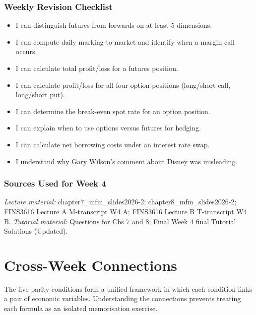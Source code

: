 \documentclass[11pt,a4paper]{article}
\newcommand{\cb}{\(\square\)\enspace}
\begin{document}
\subsubsection*{Weekly Revision Checklist}
\begin{itemize}[leftmargin=2em]
  \item[\cb] I can distinguish futures from forwards on at least 5 dimensions.
  \item[\cb] I can compute daily marking-to-market and identify when a margin call occurs.
  \item[\cb] I can calculate total profit/loss for a futures position.
  \item[\cb] I can calculate profit/loss for all four option positions (long/short call, long/short put).
  \item[\cb] I can determine the break-even spot rate for an option position.
  \item[\cb] I can explain when to use options versus futures for hedging.
  \item[\cb] I can calculate net borrowing costs under an interest rate swap.
  \item[\cb] I understand why Gary Wilson's comment about Disney was misleading.
\end{itemize}

\subsubsection*{Sources Used for Week 4}
{\sloppy\noindent\textit{Lecture material:} chapter7\_mfm\_slides2026-2; chapter8\_mfm\_slides2026-2; FINS3616 Lecture A M-transcript W4 A; FINS3616 Lecture B T-transcript W4 B\@. \textit{Tutorial material:} Questions for Chs 7 and 8; Final Week 4 final Tutorial Solutions (Updated).\par}

\newpage

\section{Cross-Week Connections}

The five parity conditions form a unified framework in which each condition links a pair of economic variables. Understanding the connections prevents treating each formula as an isolated memorisation exercise.
\end{document}
